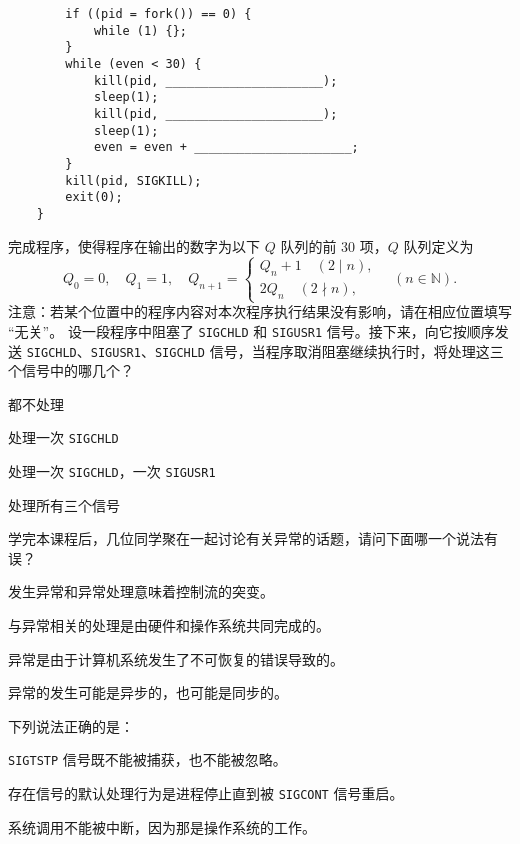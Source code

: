 \begin{problems}
\begin{verbatim}
        if ((pid = fork()) == 0) {
            while (1) {};
        }
        while (even < 30) {
            kill(pid, ______________________);
            sleep(1);
            kill(pid, ______________________);
            sleep(1);
            even = even + ______________________;
        }
        kill(pid, SIGKILL);
        exit(0);
    }
        \end{verbatim}
        完成程序，使得程序在输出的数字为以下 $Q$ 队列的前 30 项，$Q$ 队列定义为
        \[ Q_0=0, \quad Q_1=1, \quad Q_{n+1} = \begin{cases}
            Q_n+1 \quad (2 \mid n), \\
            2Q_n \quad (2 \nmid n),
        \end{cases} \quad (n \in \mathbb N). \]
        注意：若某个位置中的程序内容对本次程序执行结果没有影响，请在相应位置填写 “无关”。
         设一段程序中阻塞了 \verb|SIGCHLD| 和 \verb|SIGUSR1| 信号。接下来，向它按顺序发送 \verb|SIGCHLD|、\verb|SIGUSR1|、\verb|SIGCHLD| 信号，当程序取消阻塞继续执行时，将处理这三个信号中的哪几个？
        \begin{choices}
            \item 都不处理
            \item 处理一次 \verb|SIGCHLD|
            \item 处理一次 \verb|SIGCHLD|，一次 \verb|SIGUSR1|
            \item 处理所有三个信号
        \end{choices}
         学完本课程后，几位同学聚在一起讨论有关异常的话题，请问下面哪一个说法有误？
        \begin{choices}
            \item 发生异常和异常处理意味着控制流的突变。
            \item 与异常相关的处理是由硬件和操作系统共同完成的。
            \item 异常是由于计算机系统发生了不可恢复的错误导致的。
            \item 异常的发生可能是异步的，也可能是同步的。
        \end{choices}
         下列说法正确的是：
        \begin{choices}
            \item \verb|SIGTSTP| 信号既不能被捕获，也不能被忽略。
            \item 存在信号的默认处理行为是进程停止直到被 \verb|SIGCONT| 信号重启。
            \item 系统调用不能被中断，因为那是操作系统的工作。

\end{choices}
\end{problems}
